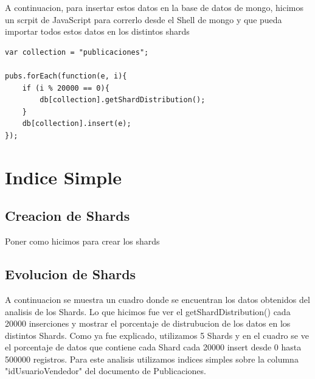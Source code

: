 \documentclass[a4paper, 10pt, twoside]{article}
\begin{document}
A continuacion, para insertar estos datos en la base de datos de mongo, hicimos un scrpit de JavaScript para correrlo desde el Shell de mongo y que pueda importar todos estos datos en los distintos shards




\begin{lstlisting}[caption=Ejercicio 6]
var collection = "publicaciones";

pubs.forEach(function(e, i){
    if (i % 20000 == 0){
        db[collection].getShardDistribution();
    }
    db[collection].insert(e);
});
\end{lstlisting}


\section{Indice Simple}

\subsection{Creacion de Shards}

Poner como hicimos para crear los shards

\subsection{Evolucion de Shards}

A continuacion se muestra un cuadro donde se encuentran los datos obtenidos del analisis de los Shards. Lo que hicimos fue ver el getShardDistribution() cada 20000 inserciones y mostrar el porcentaje de distrubucion de los datos en los distintos Shards.
Como ya fue explicado, utilizamos 5 Shards y en el cuadro se ve el porcentaje de datos que contiene cada Shard cada 20000 insert desde 0 hasta 500000 registros.
Para este analisis utilizamos indices simples sobre la columna "idUsuarioVendedor" del documento de Publicaciones.
\end{document}
